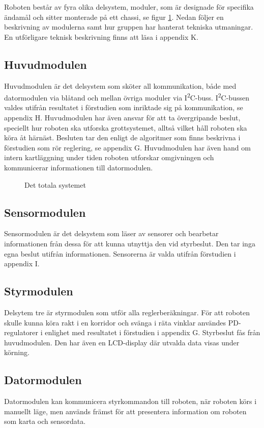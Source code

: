 \documentclass[11pt]{article}
\begin{document}
\begin{flushleft}
Roboten består av fyra olika delsystem, moduler, som är designade för specifika ändamål och sitter monterade på ett chassi, se figur \ref{overview}. Nedan följer en beskrivning av modulerna samt hur gruppen har hanterat tekniska utmaningar. En utförligare teknisk beskrivning finns att läsa i appendix K. 


\subsection{Huvudmodulen}
Huvudmodulen är det delsystem som sköter all kommunikation, både med datormodulen via blåtand och mellan övriga moduler via I\textsuperscript{2}C-buss. I\textsuperscript{2}C-bussen valdes utifrån resultatet i förstudien som inriktade sig på kommunikation, se appendix H. Huvudmodulen har även ansvar för att ta övergripande beslut, speciellt hur roboten ska utforska grottsystemet, alltså vilket håll roboten ska köra åt härnäst. Besluten tar den enligt de algoritmer som finns beskrivna i förstudien som rör reglering, se appendix G. Huvudmodulen har även hand om intern kartläggning under tiden roboten utforskar omgivningen och kommunicerar informationen till datormodulen. 

\begin{figure}[!htbp]
\centering
\noindent\resizebox{.7\linewidth}{!}{
	}
	\caption{Det totala systemet \label{overview}}	
\end{figure}

\subsection{Sensormodulen}
Sensormodulen är det delsystem som läser av sensorer och bearbetar informationen från dessa för att kunna utnyttja den vid styrbeslut. Den tar inga egna beslut utifrån informationen. Sensorerna är valda utifrån förstudien i appendix I. 

\subsection{Styrmodulen}
Delsytem tre är styrmodulen som utför alla reglerberäkningar. För att roboten skulle kunna köra rakt i en korridor och svänga i räta vinklar användes PD-regulatorer i enlighet med resultatet i förstudien i appendix G. Styrbeslut fås från huvudmodulen. Den har även en LCD-display där utvalda data visas under körning. 

\subsection{Datormodulen}
Datormodulen kan kommunicera styrkommandon till roboten, när roboten körs i manuellt läge, men används främst för att presentera information om roboten som karta och sensordata. 


\end{flushleft}
\end{document}
